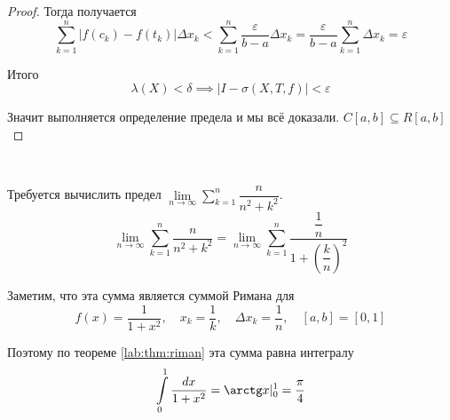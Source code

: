\documentclass[../main.tex]{subfiles}
\begin{document}
\begin{proof}
    Тогда получается 
    \[ \sum\limits_{ k=1}^{ n} \left| f\left( c_k\right)-f\left( t_k\right)\right| \Delta x_k < \sum\limits_{ k=1}^{ n} \dfrac{ \varepsilon}{ b-a} \Delta x_k= \dfrac{ \varepsilon}{ b-a} \sum\limits_{ k=1}^{ n} \Delta x_k= \varepsilon \]

    Итого 
    \[ \lambda \left( X\right) < \delta \implies \left| I-\sigma\left( X,T,f\right)\right| < \varepsilon \]

    Значит выполняется определение предела и мы всё доказали. \( C\left[ a,b\right] \subseteq R \left[ a,b\right]\)
\end{proof}

\begin{example}
    
    ~

    Требуется вычислить предел \( \lim\limits_{ n\rightarrow \infty } \sum\limits_{ k=1}^{ n} \dfrac{ n}{ n^2+k^2}\). 
    \[ \lim\limits_{ n\rightarrow \infty } \sum\limits_{ k=1}^{ n} \dfrac{ n}{ n^2+k^2}=\lim\limits_{ n\rightarrow \infty } \sum\limits_{ k=1}^{ n} \dfrac{ \dfrac{ 1}{ n} }{ 1+ \left(\dfrac{ k}{ n} \right)^2}\]

    Заметим, что эта сумма является суммой Римана для 
    \[ f\left( x\right)= \dfrac{ 1}{ 1+x^2} ,\quad x_k= \dfrac{ 1}{ k} ,\quad \Delta x_k= \dfrac{ 1}{ n} ,\quad \left[ a,b\right]=\left[ 0,1\right]\] 
    
    Поэтому по теореме \ref{lab:thm:riman} эта сумма равна интегралу 
    \[ \displaystyle\int\limits_{ 0}^{ 1} \dfrac{ dx}{ 1+x^2} = \arctg x |_0^1 = \dfrac{ \pi}{ 4} \]
\end{example}
\end{document}
